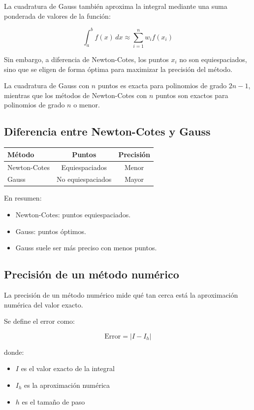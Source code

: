 \documentclass[12pt,a4paper]{article}
\begin{document}
La cuadratura de Gauss también aproxima la integral mediante una suma ponderada de valores
de la función:

\[
\int_a^b f(x)\,dx \approx \sum_{i=1}^{n} w_i f(x_i)
\]

Sin embargo, a diferencia de Newton-Cotes, los puntos $x_i$ no son equiespaciados,
sino que se eligen de forma óptima para maximizar la precisión del método.

La cuadratura de Gauss con $n$ puntos es exacta para polinomios de grado $2n-1$,
mientras que los métodos de Newton-Cotes con $n$ puntos son exactos para polinomios
de grado $n$ o menor.

\subsection{Diferencia entre Newton-Cotes y Gauss}

\begin{center}
\begin{tabular}{lcc}
\toprule
Método & Puntos & Precisión \\
\midrule
Newton-Cotes & Equiespaciados & Menor \\
Gauss & No equiespaciados & Mayor \\
\bottomrule
\end{tabular}
\end{center}

En resumen:

\begin{itemize}
\item Newton-Cotes: puntos equiespaciados.
\item Gauss: puntos óptimos.
\item Gauss suele ser más preciso con menos puntos.
\end{itemize}


\subsection{Precisión de un método numérico}

La precisión de un método numérico mide qué tan cerca está la aproximación numérica
del valor exacto.

Se define el error como:

\[
\text{Error} = \left| I - I_h \right|
\]

donde:
\begin{itemize}
\item $I$ es el valor exacto de la integral
\item $I_h$ es la aproximación numérica
\item $h$ es el tamaño de paso
\end{itemize}
\end{document}
